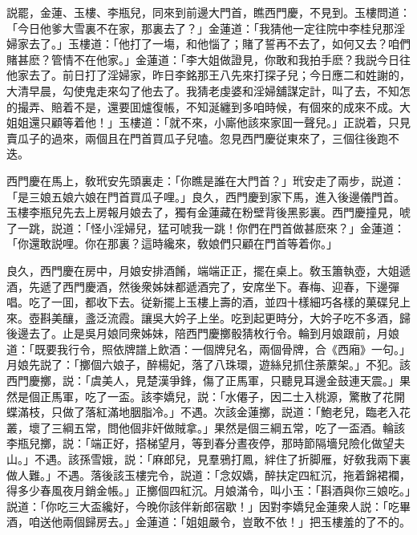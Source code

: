 説罷，金蓮、玉樓、李瓶兒，同來到前邊大門首，瞧西門慶，不見到。玉樓問道：「今日他爹大雪裏不在家，那裏去了？」金蓮道：「我猜他一定往院中李桂兒那淫婦家去了。」玉樓道：「他打了一塲，和他惱了；賭了誓再不去了，如何又去？咱們賭甚麽？管情不在他家。」金蓮道：「李大姐做證見，你敢和我拍手麽？我説今日往他家去了。前日打了淫婦家，昨日李銘那王八先來打探子兒；今日應二和姓謝的，大清早晨，勾使鬼走來勾了他去了。我猜老虔婆和淫婦舖謀定計，叫了去，不知怎的撮弄、賠着不是，還要囬爐復帳，不知涎纏到多咱時候，有個來的成來不成。大姐姐還只顧等着他！」玉樓道：「就不來，小廝他該來家囬一聲兒。」正説着，只見賣瓜子的過來，兩個且在門首買瓜子兒嗑。忽見西門慶従東來了，三個往後跑不迭。

西門慶在馬上，敎玳安先頭裏走：「你瞧是誰在大門首？」玳安走了兩步，説道：「是三娘五娘六娘在門首買瓜子哩。」良久，西門慶到家下馬，進入後邊儀門首。玉樓李瓶兒先去上房報月娘去了，獨有金蓮藏在粉壁背後黑影裏。西門慶撞見，唬了一跳，説道：「怪小淫婦兒，猛可唬我一跳！你們在門首做甚麽來？」金蓮道：「你還敢説哩。你在那裏？這時纔來，敎娘們只顧在門首等着你。」

良久，西門慶在房中，月娘安排酒餚，端端正正，擺在桌上。敎玉簫執壺，大姐遞酒，先遞了西門慶酒，然後衆姊妹都遞酒完了，安席坐下。春梅、迎春，下邊彈唱。吃了一囬，都收下去。従新擺上玉樓上壽的酒，並四十樣細巧各樣的菓碟兒上來。壺斟美釀，盞泛流霞。讓吳大妗子上坐。吃到起更時分，大妗子吃不多酒，歸後邊去了。止是吳月娘同衆姊妹，陪西門慶擲骰猜枚行令。輪到月娘跟前，月娘道：「既要我行令，照依牌譜上飲酒：一個牌兒名，兩個骨牌，合《西廂》一句。」月娘先説了：「擲個六娘子，醉楊妃，落了八珠環，遊絲兒抓住荼䕷架。」不犯。該西門慶擲，説：「虞美人，見楚漢爭鋒，傷了正馬軍，只聽見耳邊金鼓連天震。」果然是個正馬軍，吃了一盃。該李嬌兒，説：「水僊子，因二士入桃源，驚散了花開蝶滿枝，只做了落紅滿地胭脂冷。」不遇。次該金蓮擲，説道：「鮑老兒，臨老入花叢，壞了三綱五常，問他個非奸做賊拿。」果然是個三綱五常，吃了一盃酒。輪該李瓶兒擲，説：「端正好，搭梯望月，等到春分晝夜停，那時節隔墻兒險化做望夫山。」不遇。該孫雪娥，説：「麻郎兒，見羣鴉打鳳，絆住了折脚雁，好敎我兩下裏做人難。」不遇。落後該玉樓完令，説道：「念奴嬌，醉扶定四紅沉，拖着錦裙襴，得多少春風夜月銷金帳。」正擲個四紅沉。月娘滿令，叫小玉：「斟酒與你三娘吃。」説道：「你吃三大盃纔好，今晚你該伴新郎宿歇！」因對李嬌兒金蓮衆人説：「吃畢酒，咱送他兩個歸房去。」金蓮道：「姐姐嚴令，豈敢不依！」把玉樓羞的了不的。

